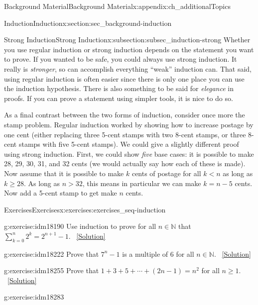 \documentclass[oneside,10pt,]{book}
\numberwithin{equation}{chapter}
\def\d{\displaystyle}
\def\N{\mathbb N}
\newcommand{\lt}{<}
\begin{document}
\begin{appendixptx}{Background Material}{}{Background Material}{}{}{x:appendix:ch_additionalTopics}
\begin{sectionptx}{Induction}{}{Induction}{}{}{x:section:sec_background-induction}
\begin{subsectionptx}{Strong Induction}{}{Strong Induction}{}{}{x:subsection:subsec_induction-strong}
Whether you use regular induction or strong induction depends on the statement you want to prove. If you wanted to be safe, you could always use strong induction. It really is \emph{stronger}, so can accomplish everything ``weak'' induction can. That said, using regular induction is often easier since there is only one place you can use the induction hypothesis. There is also something to be said for \emph{elegance} in proofs. If you can prove a statement using simpler tools, it is nice to do so.%
\par
As a final contrast between the two forms of induction, consider once more the stamp problem. Regular induction worked by showing how to increase postage by one cent (either replacing three 5-cent stamps with two 8-cent stamps, or three 8-cent stamps with five 5-cent stamps). We could give a slightly different proof using strong induction. First, we could show \emph{five} base cases: it is possible to make 28, 29, 30, 31, and 32 cents (we would actually say how each of these is made). Now assume that it is possible to make \(k\) cents of postage for all \(k \lt  n\) as long as \(k \ge 28\). As long as \(n > 32\), this means in particular we can make \(k = n-5\) cents. Now add a 5-cent stamp to get make \(n\) cents.%
\end{subsectionptx}
%
%
\typeout{************************************************}
\typeout{************************************************}
%
\begin{exercises-subsection}{Exercises}{}{Exercises}{}{}{x:exercises:exercises_seq-induction}
\begin{divisionexercise}{1}{}{}{g:exercise:idm18190}%
Use induction to prove for all \(n \in \N\) that \(\d\sum_{k=0}^n 2^k = 2^{n+1} - 1\).%
\qquad~\hfill{\tiny\hyperlink{g:solution:idm18195-main}{[Solution]}}\end{divisionexercise}%
\begin{divisionexercise}{2}{}{}{g:exercise:idm18222}%
Prove that \(7^n - 1\) is a multiple of 6 for all \(n \in \N\).%
\qquad~\hfill{\tiny\hyperlink{g:solution:idm18227-main}{[Solution]}}\end{divisionexercise}%
\begin{divisionexercise}{3}{}{}{g:exercise:idm18255}%
Prove that \(1 + 3 + 5 + \cdots + (2n-1) = n^2\) for all \(n \ge 1\).%
\qquad~\hfill{\tiny\hyperlink{g:solution:idm18260-main}{[Solution]}}\end{divisionexercise}%
\begin{divisionexercise}{4}{}{}{g:exercise:idm18283}%

\end{divisionexercise}
\end{exercises-subsection}
\end{sectionptx}
\end{appendixptx}
\end{document}
